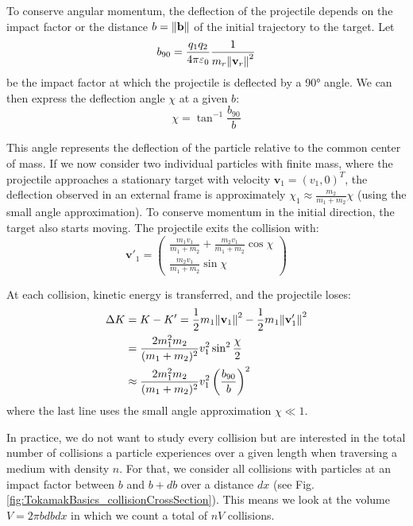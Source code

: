 To conserve angular momentum, the deflection of the projectile depends on the impact factor or the distance \( b = \norm{\mathbf{b}} \) of the initial trajectory to the target. Let
\begin{equation}
	b_{90} = \frac{q_1q_2}{4\pi\varepsilon_0}\frac{1}{m_r\norm{\mathbf{v}_r}^2}
\end{equation}
be the impact factor at which the projectile is deflected by a 90° angle. We can then express the deflection angle \( \chi \) at a given \( b \):
\begin{equation}
	\label{eq:1_b90}
	\chi = \tan^{-1}\frac{b_{90}}{b}
\end{equation}

This angle represents the deflection of the particle relative to the common center of mass. If we now consider two individual particles with finite mass, where the projectile approaches a stationary target with velocity \( \mathbf{v}_1 = (v_1, 0)^T \), the deflection observed in an external frame is approximately \( \chi_1 \approx \frac{m_2}{m_1 + m_2}\chi \) (using the small angle approximation). To conserve momentum in the initial direction, the target also starts moving. The projectile exits the collision with:
\begin{equation}
	\mathbf{v}'_1 = \begin{pmatrix}
		\frac{m_1v_1}{m_1 + m_2} + \frac{m_2v_1}{m_1 + m_2}\cos\chi \\
		\frac{m_2v_1}{m_1 + m_2}\sin\chi
	\end{pmatrix}
\end{equation}

At each collision, kinetic energy is transferred, and the projectile loses:
\begin{align}
	\Delta K &= K - K' = \frac{1}{2} m_1 \norm{\mathbf{v}_1}^2 - \frac{1}{2} m_1 \norm{\mathbf{v}'_1}^2 \nonumber \\
	&= \frac{2m_1^2m_2}{(m_1 + m_2)^2} v_1^2 \sin^2\frac{\chi}{2} \nonumber \\
	&\approx \frac{2m_1^2m_2}{(m_1 + m_2)^2} v_1^2 \left(\frac{b_{90}}{b}\right)^2
	\label{eq:1_particleCollision_energyLoss}
\end{align}
where the last line uses the small angle approximation \( \chi \ll 1 \).

In practice, we do not want to study every collision but are interested in the total number of collisions a particle experiences over a given length when traversing a medium with density \( n \). For that, we consider all collisions with particles at an impact factor between \( b \) and \( b + d\!b \) over a distance \( d\!x \) (see Fig. \ref{fig:TokamakBasics_collisionCrossSection}). This means we look at the volume \( V = 2\pi b d\!b d\!x \) in which we count a total of \( nV \) collisions.

